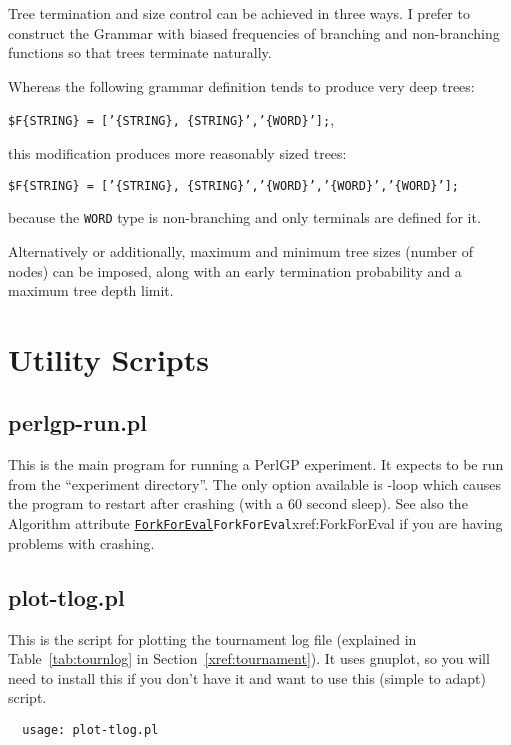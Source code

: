 \documentclass[a4paper]{article}
\begin{document}
Tree termination and size control can be achieved in three ways.  I
prefer to construct the Grammar with biased frequencies of branching
and non-branching functions so that trees terminate naturally.

  Whereas the following grammar definition tends to produce
very deep trees:

\texttt{\$F\{STRING\} = ['\{STRING\}, \{STRING\}','\{WORD\}'];},

\noindent this modification produces more reasonably sized trees:

\texttt{\$F\{STRING\} = ['\{STRING\}, \{STRING\}','\{WORD\}','\{WORD\}','\{WORD\}'];}

\noindent because the \texttt{WORD} type is non-branching and only terminals
are defined for it.

Alternatively or additionally, maximum and minimum tree sizes
(number of nodes) can be imposed, along with an early termination
probability and a maximum tree depth limit.


\section{Utility Scripts}\label{Utilities}

\subsection{perlgp-run.pl}

This is the main program for running a PerlGP experiment.  It expects
to be run from the ``experiment directory''.  The only option
available is -loop which causes the program to restart after crashing
(with a 60 second sleep).  See also the Algorithm attribute
\hyperref[no]{\texttt{ForkForEval}}{\texttt{ForkForEval}}{xref:ForkForEval} if you are having problems with crashing.

\subsection{plot-tlog.pl}

This is the script for plotting the tournament log file (explained in
Table~\ref{tab:tournlog} in Section~\ref{xref:tournament}).  It uses
gnuplot, so you will need to install this if you don't have it and
want to use this (simple to adapt) script.

\begin{verbatim}
  usage: plot-tlog.pl
\end{verbatim}
\end{document}
